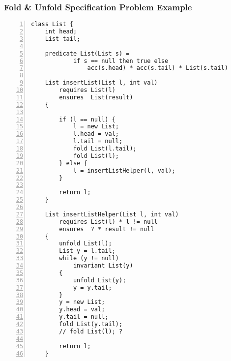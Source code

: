 \documentclass {llncs}
\begin{document}
\subsubsection{Fold \& Unfold Specification Problem Example}
\begin{example}\label{ex:fold-unfold-problem}
\hspace{0.5cm}

\begin{lstlisting}[numbers=left,stepnumber=1]
class List {
    int head;
    List tail;

    predicate List(List s) = 
    	    if s == null then true else
    	        acc(s.head) * acc(s.tail) * List(s.tail)

    List insertList(List l, int val)
        requires List(l)
        ensures  List(result)
    {
        
        if (l == null) {
            l = new List;
            l.head = val;
            l.tail = null;
            fold List(l.tail);
            fold List(l);
        } else {
            l = insertListHelper(l, val);
        } 
   
        return l;
    }
    
    List insertListHelper(List l, int val)
        requires List(l) * l != null
        ensures  ? * result != null
    {
        unfold List(l);
        List y = l.tail;
        while (y != null) 
            invariant List(y)
        {
            unfold List(y);
            y = y.tail;
        }
        y = new List;
        y.head = val;
        y.tail = null;
        fold List(y.tail);
        // fold List(l); ?
        
        return l;
    }
\end{lstlisting}
\end{example}

\end{document}
